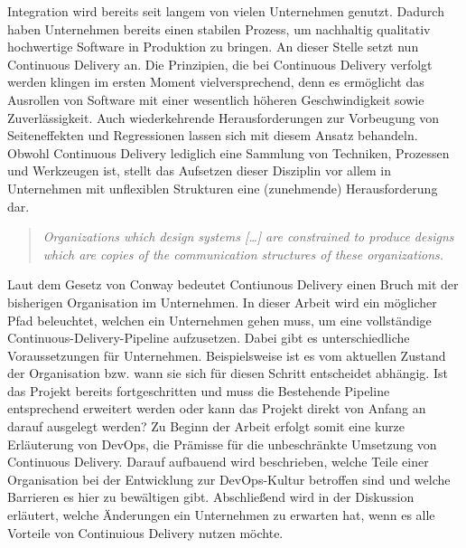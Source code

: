 
 Integration wird bereits seit langem von vielen Unternehmen genutzt. Dadurch haben Unternehmen bereits einen stabilen Prozess, um nachhaltig qualitativ hochwertige Software in Produktion zu bringen. An dieser Stelle setzt nun Continuous Delivery an. Die Prinzipien, die bei Continuous Delivery verfolgt werden klingen im ersten Moment vielversprechend, denn es ermöglicht das Ausrollen von Software mit einer wesentlich höheren Geschwindigkeit sowie Zuverlässigkeit. Auch wiederkehrende Herausforderungen zur Vorbeugung von Seiteneffekten und Regressionen lassen sich mit diesem Ansatz behandeln. Obwohl Continuous Delivery lediglich eine Sammlung von Techniken, Prozessen und Werkzeugen ist, stellt das Aufsetzen dieser Disziplin vor allem in Unternehmen mit unflexiblen Strukturen eine (zunehmende) Herausforderung dar. 

\begin{quote} \textit{\glqq Organizations which design systems […] are constrained to produce designs which are copies of the communication structures of these organizations. \grqq~}\cite[S.5]{Farley.2011}\\ \end{quote} 

Laut dem Gesetz von Conway bedeutet Contiunous Delivery einen Bruch mit der bisherigen Organisation im Unternehmen. In dieser Arbeit wird ein möglicher Pfad beleuchtet, welchen ein Unternehmen gehen muss, um eine vollständige Continuous-Delivery-Pipeline aufzusetzen. Dabei gibt es unterschiedliche Voraussetzungen für Unternehmen. Beispielsweise ist es vom aktuellen Zustand der Organisation bzw. wann sie sich für diesen Schritt entscheidet abhängig. Ist das Projekt bereits fortgeschritten und muss die Bestehende Pipeline entsprechend erweitert werden oder kann das Projekt direkt von Anfang an darauf ausgelegt werden? Zu Beginn der Arbeit erfolgt somit eine kurze Erläuterung von DevOps, die Prämisse für die unbeschränkte Umsetzung von Continuous Delivery. Darauf aufbauend wird beschrieben, welche Teile einer Organisation bei der Entwicklung zur DevOps-Kultur betroffen sind und welche Barrieren es hier zu bewältigen gibt. Abschließend wird in der Diskussion erläutert, welche Änderungen ein Unternehmen zu erwarten hat, wenn es alle Vorteile von Continuious Delivery nutzen möchte.


